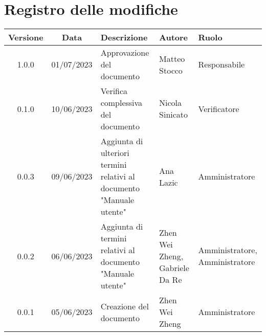 \section*{Registro delle modifiche}
\begin{center}
\setlength\extrarowheight{5pt}
\renewcommand\tabularxcolumn[1]{>{\Centering}m{#1}}
\begin{tabularx}{\textwidth}{| c | c | X | X | X |} 
\hline
\rowcolor{white}
\textbf{Versione} & \textbf{Data} & \textbf{Descrizione} & \textbf{Autore} & \textbf{Ruolo}\\
\hline
 1.0.0 & 01/07/2023 & Approvazione del documento & Matteo Stocco & Responsabile\\
 \hline
 0.1.0 & 10/06/2023 & Verifica complessiva del documento & Nicola Sinicato & Verificatore \\
 \hline
 0.0.3 & 09/06/2023 & Aggiunta di ulteriori termini relativi al documento "Manuale utente" & Ana Lazic & Amministratore\\
 \hline
 0.0.2 & 06/06/2023 & Aggiunta di termini relativi al documento "Manuale utente" & Zhen Wei Zheng, Gabriele Da Re & Amministratore, Amministratore\\
 \hline
 0.0.1 & 05/06/2023 & Creazione del documento & Zhen Wei Zheng & Amministratore\\
 \hline
\end{tabularx}
\end{center}

